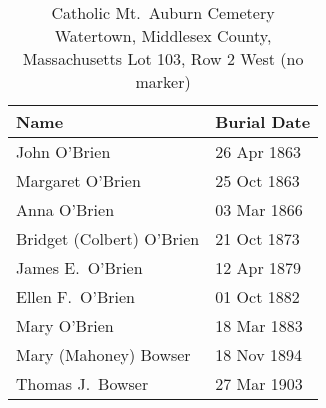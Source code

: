 \begin{table}[ht]
	\centering
	\caption{Catholic Mt.\ Auburn Cemetery\cite{BillMcEvoy} \\
		Watertown, Middlesex County, Massachusetts
		Lot 103, Row 2 West (no marker)}
	\begin{tabular}{|l|l|}
		\hline
		\textbf{Name} & \textbf{Burial Date} \\
		\hline
		John O'Brien\index{O'Brien!John\textsuperscript{2}} & 26 Apr 1863 \\
		\hline
		Margaret O'Brien\index{O'Brien!Margaret\textsuperscript{3} (1862--1863)} & 25 Oct 1863 \\
		\hline
		Anna O'Brien\index{O'Brien!Anna\textsuperscript{3}} & 03 Mar 1866 \\
		\hline
		Bridget (Colbert) O'Brien\index{Colbert!Bridget}\index{O'Brien!Bridget (Colbert)} & 21 Oct 1873 \\
		\hline
		James E.\ O'Brien\index{O'Brien!James Edward\textsuperscript{3}} & 12 Apr 1879 \\
		\hline
		Ellen F.\ O'Brien\index{O'Brien!Ellen/Nellie\textsuperscript{3} (1859--1882)} & 01 Oct 1882 \\
		\hline
		Mary O'Brien\index{O'Brien!Mary\textsuperscript{3} (1856--1883)} & 18 Mar 1883 \\
		\hline
		Mary (Mahoney) Bowser\index{Mahoney/Mahony!Mary}\index{O'Brien!Mary (Mahoney)}\index{Bowser!Mary (Mahoney) (O'Brien)} & 18 Nov 1894 \\
		\hline
		Thomas J.\ Bowser\index{Bowser!Thomas} & 27 Mar 1903 \\
		\hline
	\end{tabular}
\end{table}

